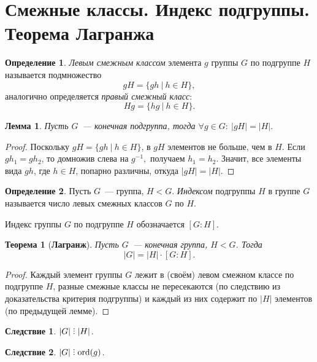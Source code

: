 \documentclass[a4paper, 14pt]{extarticle}
\newcommand{\n}{\par}
\newcommand{\ord}{\mathrm{ord}}
\DeclareRobustCommand{\divby}{%
	\mathrel{\text{\vbox{\baselineskip.65ex\lineskiplimit0pt\hbox{.}\hbox{.}\hbox{.}}}}%
}
\theoremstyle{definition}
\newtheorem{definition}{Определение}
\theoremstyle{plain}
\newtheorem*{theorem*}{Теорема}
\numberwithin{theorem}{section}
\numberwithin{definition}{section}
\numberwithin{statement}{section}
\newtheorem*{lemma*}{Лемма}
\numberwithin{lemma}{section}
\newtheorem{consequence}{Следствие}
\numberwithin{consequence}{section}
\begin{document}
	\section{Смежные классы. Индекс подгруппы. Теорема Лагранжа}
	\setcounter{definition}{0}
	\begin{definition}
		\textit{Левым смежным классом} элемента $g$ группы $G$ по подгруппе $H$ называется подмножество
		\begin{equation*}
			gH = \{gh \ | \ h \in H\},
		\end{equation*}
		аналогично определяется \textit{правый смежный класс}:
		\begin{equation*}
			Hg = \{hg \ | \ h \in H\}.
		\end{equation*}
	\end{definition}
	\begin{lemma*}
		Пусть $G$~--- конечная подгруппа, тогда $\forall g \in G{:} \ |gH| = |H|.$
	\end{lemma*}
	\begin{proof}
		Поскольку ${gH = \{gh \ | \ h \in H\}}$, в $gH$ элементов не больше, чем в $H$. Если ${gh_1 = gh_2}$, то домножив слева на $g^{-1},$ получаем ${h_1 = h_2}$. Значит, все элементы вида $gh$, где ${h \in H}$, попарно различны, откуда ${|gH| = |H|}$.
	\end{proof}
	\begin{definition}
		Пусть $G$~--- группа, $H < G$. \textit{Индексом} подгруппы $H$ в группе $G$ называется число левых смежных классов $G$ по $H$.
	\end{definition} \n
	Индекс группы $G$ по подгруппе $H$ обозначается $[G : H]$.
	\begin{theorem*}[\textbf{Лагранж}]
		Пусть $G$~--- конечная группа, $H < G$. Тогда
		\begin{equation*}
			|G| = |H| \cdot [G : H].
		\end{equation*}
	\end{theorem*}
	\begin{proof}
		Каждый элемент группы $G$ лежит в (своём) левом смежном классе по подгруппе $H$, разные смежные классы не пересекаются (по следствию из доказательства критерия подгруппы) и каждый из них содержит по $|H|$ элементов (по предыдущей лемме).
	\end{proof}
	\newpage
	\begin{consequence}
		$|G| \divby |H|$.
	\end{consequence}
	\begin{consequence}
		$|G| \divby \ord(g)$.
	\end{consequence}
\end{document}
